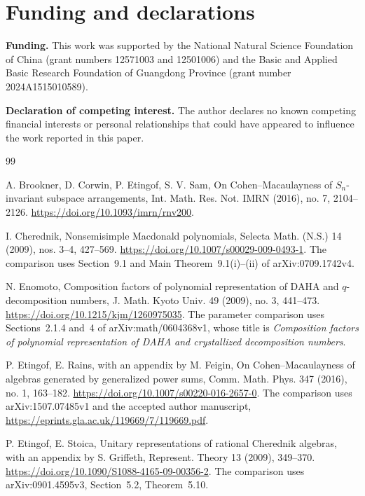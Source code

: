 \documentclass[10pt,fleqn]{article}
\numberwithin{equation}{section}
\begin{document}
\section*{Funding and declarations}

\noindent\textbf{Funding.}
This work was supported by the National Natural Science Foundation of China
(grant numbers 12571003 and 12501006) and the Basic and Applied Basic Research
Foundation of Guangdong Province (grant number 2024A1515010589).

\smallskip
\noindent\textbf{Declaration of competing interest.}
The author declares no known competing financial interests or personal
relationships that could have appeared to influence the work reported in this
paper.

\begin{thebibliography}{99}

A. Brookner, D. Corwin, P. Etingof, S. V. Sam,
On Cohen--Macaulayness of $S_n$-invariant subspace arrangements,
Int. Math. Res. Not. IMRN (2016), no. 7, 2104--2126.
\newblock \url{https://doi.org/10.1093/imrn/rnv200}.

I. Cherednik,
Nonsemisimple Macdonald polynomials,
Selecta Math. (N.S.) 14 (2009), nos. 3--4, 427--569.
\newblock \url{https://doi.org/10.1007/s00029-009-0493-1}.
\newblock The comparison uses Section~9.1 and Main Theorem~9.1(i)--(ii)
of arXiv:0709.1742v4.

N. Enomoto,
Composition factors of polynomial representation of DAHA and
$q$-decomposition numbers,
J. Math. Kyoto Univ. 49 (2009), no. 3, 441--473.
\newblock \url{https://doi.org/10.1215/kjm/1260975035}.
\newblock The parameter comparison uses Sections~2.1.4 and~4 of
arXiv:math/0604368v1, whose title is
\emph{Composition factors of polynomial representation of DAHA and
crystallized decomposition numbers}.

P. Etingof, E. Rains, with an appendix by M. Feigin,
On Cohen--Macaulayness of algebras generated by generalized power sums,
Comm. Math. Phys. 347 (2016), no. 1, 163--182.
\newblock \url{https://doi.org/10.1007/s00220-016-2657-0}.
\newblock The comparison uses arXiv:1507.07485v1 and the accepted author
manuscript, \url{https://eprints.gla.ac.uk/119669/7/119669.pdf}.

P. Etingof, E. Stoica,
Unitary representations of rational Cherednik algebras,
with an appendix by S. Griffeth,
Represent. Theory 13 (2009), 349--370.
\newblock \url{https://doi.org/10.1090/S1088-4165-09-00356-2}.
The comparison uses arXiv:0901.4595v3, Section~5.2, Theorem~5.10.


\end{thebibliography}
\end{document}
